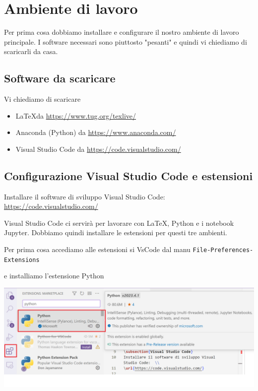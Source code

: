 \documentclass[a4paper]{article}
\begin{document}
\section{Ambiente di lavoro}

Per prima cosa dobbiamo installare e configurare il nostro ambiente di lavoro principale. I software necessari sono piuttosto "pesanti" e quindi vi chiediamo di scaricarli da casa.

\newpage
\subsection{Software da scaricare}
Vi chiediamo di scaricare 

\begin{itemize}
    \item \LaTeX da \url{https://www.tug.org/texlive/}
    \item Anaconda (Python) da \url{https://www.anaconda.com/}
    \item Visual Studio Code da \url{https://code.visualstudio.com/}
\end{itemize}




\subsection{Configurazione Visual Studio Code e estensioni}
Installare il software di sviluppo Visual Studio Code:  \\
\url{https://code.visualstudio.com/}

Visual Studio Code ci servirà per lavorare con \LaTeX, Python e i notebook Jupyter. Dobbiamo quindi installare le estensioni per questi tre ambienti.

Per prima cosa accediamo alle estensioni si VsCode dal manu \verb|File-Preferences-Extensions|

e installiamo l'estensione Python



\includegraphics[scale=0.4]{vscode-python.png}
\end{document}
